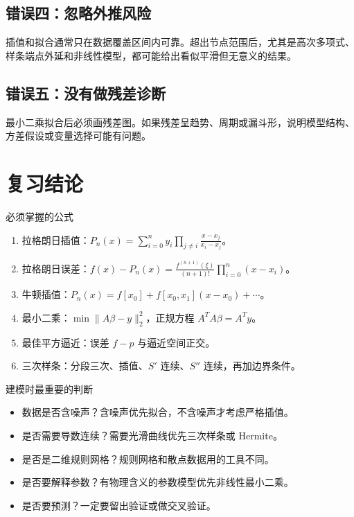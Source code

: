 \documentclass[11pt,a4paper]{ctexart}
\begin{document}
\subsection{错误四：忽略外推风险}

插值和拟合通常只在数据覆盖区间内可靠。超出节点范围后，尤其是高次多项式、样条端点外延和非线性模型，都可能给出看似平滑但无意义的结果。

\subsection{错误五：没有做残差诊断}

最小二乘拟合后必须画残差图。如果残差呈趋势、周期或漏斗形，说明模型结构、方差假设或变量选择可能有问题。

\newpage
\section{复习结论}

\begin{keybox}{必须掌握的公式}
\begin{enumerate}[label=\arabic*)]
  \item 拉格朗日插值：$P_n(x)=\sum_{i=0}^ny_i\prod_{j\ne i}\frac{x-x_j}{x_i-x_j}$。
  \item 拉格朗日误差：$f(x)-P_n(x)=\frac{f^{(n+1)}(\xi)}{(n+1)!}\prod_{i=0}^n(x-x_i)$。
  \item 牛顿插值：$P_n(x)=f[x_0]+f[x_0,x_1](x-x_0)+\cdots$。
  \item 最小二乘：$\min\|A\beta-y\|_2^2$，正规方程 $A^TA\beta=A^Ty$。
  \item 最佳平方逼近：误差 $f-p$ 与逼近空间正交。
  \item 三次样条：分段三次、插值、$S'$ 连续、$S''$ 连续，再加边界条件。
\end{enumerate}
\end{keybox}

\begin{keybox}{建模时最重要的判断}
\begin{itemize}
  \item 数据是否含噪声？含噪声优先拟合，不含噪声才考虑严格插值。
  \item 是否需要导数连续？需要光滑曲线优先三次样条或 Hermite。
  \item 是否是二维规则网格？规则网格和散点数据用的工具不同。
  \item 是否要解释参数？有物理含义的参数模型优先非线性最小二乘。
  \item 是否要预测？一定要留出验证或做交叉验证。
\end{itemize}
\end{keybox}
\end{document}
